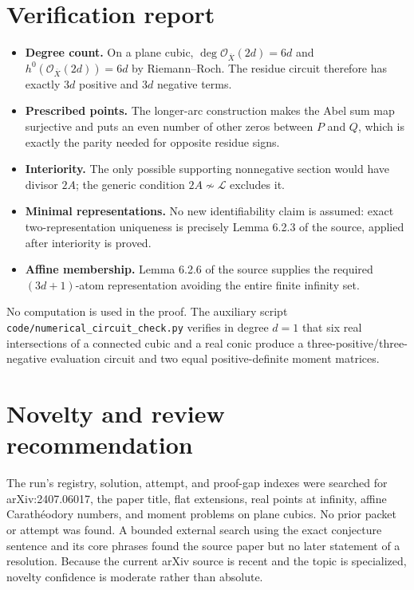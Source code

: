\documentclass[11pt]{article}
\newcommand{\cL}{\mathcal{L}}
\begin{document}
\section*{Verification report}

\begin{itemize}
\item \textbf{Degree count.} On a plane cubic,
$\deg\mathcal O_{\overline X}(2d)=6d$ and
$h^0(\mathcal O_{\overline X}(2d))=6d$ by Riemann--Roch. The residue
circuit therefore has exactly $3d$ positive and $3d$ negative terms.
\item \textbf{Prescribed points.} The longer-arc construction makes the
Abel sum map surjective and puts an even number of other zeros between
$P$ and $Q$, which is exactly the parity needed for opposite residue
signs.
\item \textbf{Interiority.} The only possible supporting nonnegative
section would have divisor $2A$; the generic condition $2A\not\sim\cL$
excludes it.
\item \textbf{Minimal representations.} No new identifiability claim is
assumed: exact two-representation uniqueness is precisely Lemma 6.2.3 of
the source, applied after interiority is proved.
\item \textbf{Affine membership.} Lemma 6.2.6 of the source supplies the
required $(3d+1)$-atom representation avoiding the entire finite infinity
set.
\end{itemize}

No computation is used in the proof. The auxiliary script
\texttt{code/numerical\_circuit\_check.py} verifies in degree $d=1$ that
six real intersections of a connected cubic and a real conic produce a
three-positive/three-negative evaluation circuit and two equal
positive-definite moment matrices.

\section*{Novelty and review recommendation}

The run's registry, solution, attempt, and proof-gap indexes were searched
for arXiv:2407.06017, the paper title, flat extensions, real points at
infinity, affine Carath\'eodory numbers, and moment problems on plane
cubics. No prior packet or attempt was found. A bounded external search
using the exact conjecture sentence and its core phrases found the source
paper but no later statement of a resolution. Because the current arXiv
source is recent and the topic is specialized, novelty confidence is
moderate rather than absolute.
\end{document}
